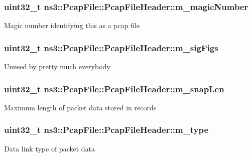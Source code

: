 \subsubsection[{\texorpdfstring{m\+\_\+magic\+Number}{m_magicNumber}}]{\setlength{\rightskip}{0pt plus 5cm}uint32\+\_\+t ns3\+::\+Pcap\+File\+::\+Pcap\+File\+Header\+::m\+\_\+magic\+Number}\hypertarget{structns3_1_1PcapFile_1_1PcapFileHeader_a53c161466b08f8aadc7ec382daf85add}{}\label{structns3_1_1PcapFile_1_1PcapFileHeader_a53c161466b08f8aadc7ec382daf85add}
Magic number identifying this as a pcap file 
\subsubsection[{\texorpdfstring{m\+\_\+sig\+Figs}{m_sigFigs}}]{\setlength{\rightskip}{0pt plus 5cm}uint32\+\_\+t ns3\+::\+Pcap\+File\+::\+Pcap\+File\+Header\+::m\+\_\+sig\+Figs}\hypertarget{structns3_1_1PcapFile_1_1PcapFileHeader_a76f5e60aad3d3cad6a316aa37186ac19}{}\label{structns3_1_1PcapFile_1_1PcapFileHeader_a76f5e60aad3d3cad6a316aa37186ac19}
Unused by pretty much everybody 
\subsubsection[{\texorpdfstring{m\+\_\+snap\+Len}{m_snapLen}}]{\setlength{\rightskip}{0pt plus 5cm}uint32\+\_\+t ns3\+::\+Pcap\+File\+::\+Pcap\+File\+Header\+::m\+\_\+snap\+Len}\hypertarget{structns3_1_1PcapFile_1_1PcapFileHeader_acadba930824bddafabd88a0b3f5e3289}{}\label{structns3_1_1PcapFile_1_1PcapFileHeader_acadba930824bddafabd88a0b3f5e3289}
Maximum length of packet data stored in records 
\subsubsection[{\texorpdfstring{m\+\_\+type}{m_type}}]{\setlength{\rightskip}{0pt plus 5cm}uint32\+\_\+t ns3\+::\+Pcap\+File\+::\+Pcap\+File\+Header\+::m\+\_\+type}\hypertarget{structns3_1_1PcapFile_1_1PcapFileHeader_ac3c13f02372a4db169cea201f028b4c1}{}\label{structns3_1_1PcapFile_1_1PcapFileHeader_ac3c13f02372a4db169cea201f028b4c1}
Data link type of packet data 
